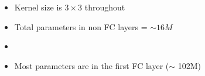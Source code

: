 
\begin{frame}
	\noindent
	       
	       
	\begin{itemize}
		\justifying
		\item<24-> Kernel size is $3 \times 3$ throughout
		\item<25-> Total parameters in non FC layers = $\sim16M$
		\item<26->
		\footnotesize{
			           
			  \onslide<30->{ = $\sim122M$}
		}
		
		\item<31-> Most parameters are in the first FC layer ($\sim$ 102M)
		       
	\end{itemize}
\end{frame}

